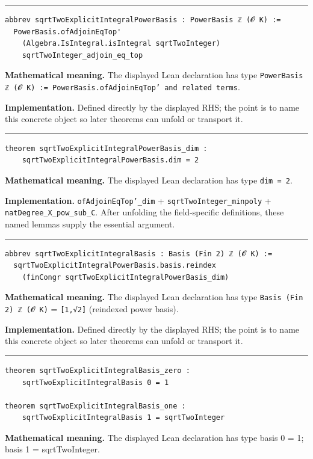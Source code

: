 \documentclass[UTF8,a4paper,11pt,fontset=fandol]{ctexart}
\theoremstyle{definition}
\newcommand{\statementsep}{\par\medskip\hrule\medskip}
\begin{document}
\statementsep
\begin{verbatim}
abbrev sqrtTwoExplicitIntegralPowerBasis : PowerBasis ℤ (𝓞 K) :=
  PowerBasis.ofAdjoinEqTop'
    (Algebra.IsIntegral.isIntegral sqrtTwoInteger)
    sqrtTwoInteger_adjoin_eq_top
\end{verbatim}
\noindent\textbf{Mathematical meaning.} The displayed Lean declaration has type \texttt{PowerBasis ℤ (𝓞 K) := PowerBasis.\allowbreak{}ofAdjoinEqTop' and related terms}.\par
\noindent\textbf{Implementation.} Defined directly by the displayed RHS; the point is to name this concrete object so later theorems can unfold or transport it.\par
\statementsep
\begin{verbatim}
theorem sqrtTwoExplicitIntegralPowerBasis_dim :
    sqrtTwoExplicitIntegralPowerBasis.dim = 2
\end{verbatim}
\noindent\textbf{Mathematical meaning.} The displayed Lean declaration has type \texttt{dim = 2}.\par
\noindent\textbf{Implementation.} \texttt{ofAdjoinEqTop'\_\allowbreak{}dim} + \texttt{sqrtTwoInteger\_\allowbreak{}minpoly} + \texttt{natDegree\_\allowbreak{}X\_\allowbreak{}pow\_\allowbreak{}sub\_\allowbreak{}C}. After unfolding the field-specific definitions, these named lemmas supply the essential argument.\par
\statementsep
\begin{verbatim}
abbrev sqrtTwoExplicitIntegralBasis : Basis (Fin 2) ℤ (𝓞 K) :=
  sqrtTwoExplicitIntegralPowerBasis.basis.reindex
    (finCongr sqrtTwoExplicitIntegralPowerBasis_dim)
\end{verbatim}
\noindent\textbf{Mathematical meaning.} The displayed Lean declaration has type \texttt{Basis (Fin 2) ℤ (𝓞 K)} = \texttt{[1,√2]} (reindexed power basis).\par
\noindent\textbf{Implementation.} Defined directly by the displayed RHS; the point is to name this concrete object so later theorems can unfold or transport it.\par
\statementsep
\begin{verbatim}
theorem sqrtTwoExplicitIntegralBasis_zero :
    sqrtTwoExplicitIntegralBasis 0 = 1

theorem sqrtTwoExplicitIntegralBasis_one :
    sqrtTwoExplicitIntegralBasis 1 = sqrtTwoInteger
\end{verbatim}
\noindent\textbf{Mathematical meaning.} The displayed Lean declaration has type basis 0 = 1; basis 1 = sqrtTwoInteger.\par
\end{document}
